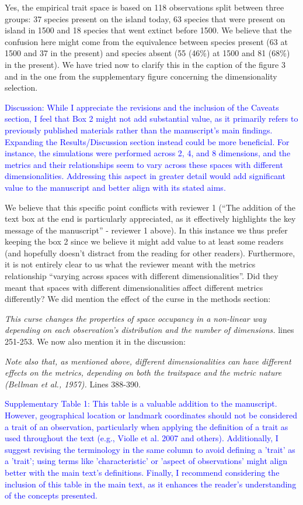 \documentclass[
]{article}
\begin{document}
Yes, the empirical trait space is based on 118 observations split between three groups: 37 species present on the island today, 63 species that were present on island in 1500 and 18 species that went extinct before 1500.
We believe that the confusion here might come from the equivalence between species present (63 at 1500 and 37 in the present) and species absent (55 (46\%) at 1500 and 81 (68\%) in the present).
We have tried now to clarify this in the caption of the figure 3 and in the one from the supplementary figure concerning the dimensionality selection.

\textcolor{blue}{Discussion: While I appreciate the revisions and the inclusion of the Caveats section, I feel that Box 2 might not add substantial value, as it primarily refers to previously published materials rather than the manuscript's main findings.
Expanding the Results/Discussion section instead could be more beneficial.
For instance, the simulations were performed across 2, 4, and 8 dimensions, and the metrics and their relationships seem to vary across these spaces with different dimensionalities.
Addressing this aspect in greater detail would add significant value to the manuscript and better align with its stated aims.}

We believe that this specific point conflicts with reviewer 1 (``The addition of the text box at the end is particularly appreciated, as it effectively highlights the key message of the manuscript'' - reviewer 1 above).
In this instance we thus prefer keeping the box 2 since we believe it might add value to at least some readers (and hopefully doesn't distract from the reading for other readers).
Furthermore, it is not entirely clear to us what the reviewer meant with the metrics relationship ``varying across spaces with different dimensionalities''.
Did they meant that spaces with different dimensionalities affect different metrics differently?
We did mention the effect of the curse in the methods section:

\textit{This curse changes the properties of space occupancy in a non-linear way depending on each observation's distribution and the number of dimensions.} lines 251-253.
We now also mention it in the discussion:

\textit{Note also that, as mentioned above, different dimensionalities can have different effects on the metrics, depending on both the traitspace and the metric nature (Bellman et al., 1957).} Lines 388-390. %


\textcolor{blue}{Supplementary Table 1: This table is a valuable addition to the manuscript.
However, geographical location or landmark coordinates should not be considered a trait of an observation, particularly when applying the definition of a trait as used throughout the text (e.g., Violle et al. 2007 and others).
Additionally, I suggest revising the terminology in the same column to avoid defining a 'trait' as a 'trait'; using terms like 'characteristic' or 'aspect of observations' might align better with the main text's definitions.
Finally, I recommend considering the inclusion of this table in the main text, as it enhances the reader's understanding of the concepts presented.}
\end{document}
